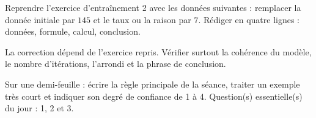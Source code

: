 
\begin{homework}Reprendre l'exercice d'entraînement 2 avec les données suivantes : remplacer la donnée initiale par $145$ et le taux ou la raison par $7$. Rédiger en quatre lignes : données, formule, calcul, conclusion.\end{homework}
\begin{solution}La correction dépend de l'exercice repris. Vérifier surtout la cohérence du modèle, le nombre d'itérations, l'arrondi et la phrase de conclusion.\end{solution}

\begin{exitticket}[3 minutes]Sur une demi-feuille : écrire la règle principale de la séance, traiter un exemple très court et indiquer son degré de confiance de 1 à 4. Question(s) essentielle(s) du jour : 1, 2 et 3.\end{exitticket}

